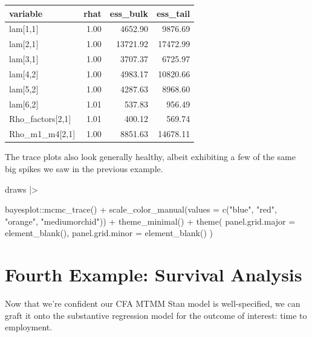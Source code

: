 \documentclass[
  letterpaper,
  DIV=11,
  numbers=noendperiod]{scrreprt}
\newenvironment{Shaded}{\begin{snugshade}}{\end{snugshade}}
\newcommand{\AttributeTok}[1]{\textcolor[rgb]{0.40,0.45,0.13}{#1}}
\newcommand{\FunctionTok}[1]{\textcolor[rgb]{0.28,0.35,0.67}{#1}}
\newcommand{\NormalTok}[1]{\textcolor[rgb]{0.00,0.23,0.31}{#1}}
\newcommand{\SpecialCharTok}[1]{\textcolor[rgb]{0.37,0.37,0.37}{#1}}
\newcommand{\StringTok}[1]{\textcolor[rgb]{0.13,0.47,0.30}{#1}}
\begin{document}
\begin{longtable}[]{@{}lrrr@{}}
\toprule()
variable & rhat & ess\_bulk & ess\_tail \\
\midrule()
\endhead
lam{[}1,1{]} & 1.00 & 4652.90 & 9876.69 \\
lam{[}2,1{]} & 1.00 & 13721.92 & 17472.99 \\
lam{[}3,1{]} & 1.00 & 3707.37 & 6725.97 \\
lam{[}4,2{]} & 1.00 & 4983.17 & 10820.66 \\
lam{[}5,2{]} & 1.00 & 4287.63 & 8968.60 \\
lam{[}6,2{]} & 1.01 & 537.83 & 956.49 \\
Rho\_factors{[}2,1{]} & 1.01 & 400.12 & 569.74 \\
Rho\_m1\_m4{[}2,1{]} & 1.00 & 8851.63 & 14678.11 \\
\bottomrule()
\end{longtable}

The trace plots also look generally healthy, albeit exhibiting a few of
the same big spikes we saw in the previous example.

\begin{Shaded}
\begin{Highlighting}[]
\NormalTok{draws }\SpecialCharTok{|\textgreater{}}

\NormalTok{  bayesplot}\SpecialCharTok{::}\FunctionTok{mcmc\_trace}\NormalTok{() }\SpecialCharTok{+} 
  \FunctionTok{scale\_color\_manual}\NormalTok{(}\AttributeTok{values =} \FunctionTok{c}\NormalTok{(}\StringTok{"blue"}\NormalTok{, }\StringTok{"red"}\NormalTok{, }\StringTok{"orange"}\NormalTok{, }\StringTok{"mediumorchid"}\NormalTok{)) }\SpecialCharTok{+} 
  \FunctionTok{theme\_minimal}\NormalTok{() }\SpecialCharTok{+}
  \FunctionTok{theme}\NormalTok{(}
    \AttributeTok{panel.grid.major =} \FunctionTok{element\_blank}\NormalTok{(),}
    \AttributeTok{panel.grid.minor =} \FunctionTok{element\_blank}\NormalTok{()}
\NormalTok{  )}
\end{Highlighting}
\end{Shaded}

\hypertarget{fourth-example-survival-analysis}{%
\section{Fourth Example: Survival
Analysis}\label{fourth-example-survival-analysis}}

Now that we're confident our CFA MTMM Stan model is well-specified, we
can graft it onto the substantive regression model for the outcome of
interest: time to employment.
\end{document}
